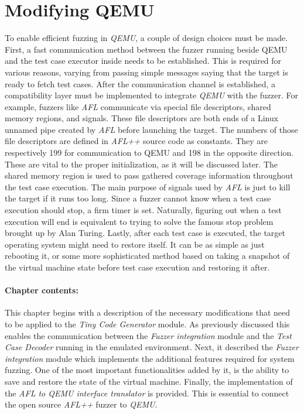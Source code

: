 \cleardoublepage
\section{Modifying QEMU} \label{chap:qemu}

To enable efficient fuzzing in \textit{QEMU}, a couple of design choices must be made. First, a fast communication method between the fuzzer running beside QEMU and the test case executor inside needs to be established. This is required for various reasons, varying from passing simple messages saying that the target is ready to fetch test cases. After the communication channel is established, a compatibility layer must be implemented to integrate \textit{QEMU} with the fuzzer. For example, fuzzers like \textit{AFL} communicate via special file descriptors, shared memory regions, and signals. These file descriptors are both ends of a Linux unnamed pipe created by \textit{AFL} before launching the target. The numbers of those file descriptors are defined in \textit{AFL++} source code as constants. They are respectively 199 for communication to QEMU and 198 in the opposite direction. These are vital to the proper initialization, as it will be discussed later. The shared memory region is used to pass gathered coverage information throughout the test case execution. The main purpose of signals used by \textit{AFL} is just to kill the target if it runs too long. Since a fuzzer cannot know when a test case execution should stop, a firm timer is set. Naturally, figuring out when a test execution will end is equivalent to trying to solve the famous stop problem brought up by Alan Turing. Lastly, after each test case is executed, the target operating system might need to restore itself. It can be as simple as just rebooting it, or some more sophisticated method based on taking a snapshot of the virtual machine state before test case execution and restoring it after.

\paragraph{Chapter contents:}
This chapter begins with a description of the necessary modifications that need to be applied to the \textit{Tiny Code Generator} module. As previously discussed this enables the communication between the \textit{Fuzzer integration} module and the \textit{Test Case Decoder} running in the emulated environment. Next, it described the \textit{Fuzzer integration} module which implements the additional features required for system fuzzing. One of the most important functionalities added by it, is the ability to save and restore the state of the virtual machine. Finally, the implementation of the \textit{AFL to QEMU interface translator} is provided. This is essential to connect the open source \textit{AFL++} fuzzer to \textit{QEMU}.

